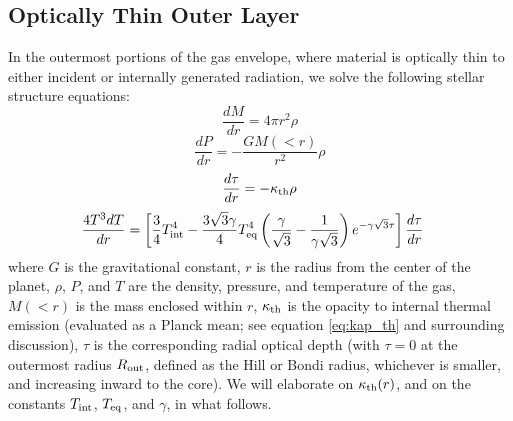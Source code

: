 \documentclass[fleqn,useAMS,usenatbib]{mnras}
\begin{document}
\subsection{Optically Thin Outer Layer}
\label{ssec:optically_thin_outer_layer}

In the outermost portions of the gas envelope, where material
is optically thin to either incident or internally generated
radiation, we solve the following stellar structure equations:
%
\begin{equation}
    \frac{dM}{dr} = 4\pi r^2 \rho
    \label{eq1}
\end{equation}
\begin{equation}
    \frac{dP}{dr} = -\frac{GM(<r)}{r^2} \rho
    \label{eq2}
\end{equation}
\begin{equation}
     \frac{d\tau}{dr} = -\kappa_{\rm th}\rho
     \label{eq3}
\end{equation}
\begin{align}
    \frac{4T^3dT}{dr} &= \left[\frac{3}{4}T^4_{\rm int} - \frac{3\sqrt{3}\gamma}{4}T^4_{\rm eq}\left(\frac{\gamma}{\sqrt{3}} - \frac{1}{\gamma\sqrt{3}}\right)e^{-\gamma\sqrt{3}\tau}\right]\frac{d\tau}{dr}
\label{eq4}
\end{align}
%
where $G$ is the gravitational constant, $r$ is the radius from the center
of the planet, $\rho$, $P$, and $T$ are the density, pressure, and
temperature of the gas, $M(<r)$ is the mass enclosed within $r$,
$\kappa_{\rm th}$ is the opacity to internal thermal emission
(evaluated as a Planck mean; see equation \ref{eq:kap_th} and
surrounding discussion),
$\tau$ is the corresponding radial optical depth (with $\tau=0$
at the outermost radius $R_{\rm out}$, defined as the Hill or Bondi radius, whichever is smaller, and increasing inward to the core).
We will elaborate on $\kappa_{\rm th} (r)$,
and on the constants $T_{\rm int}$, $T_{\rm eq}$, and $\gamma$,
in what follows.
\end{document}

